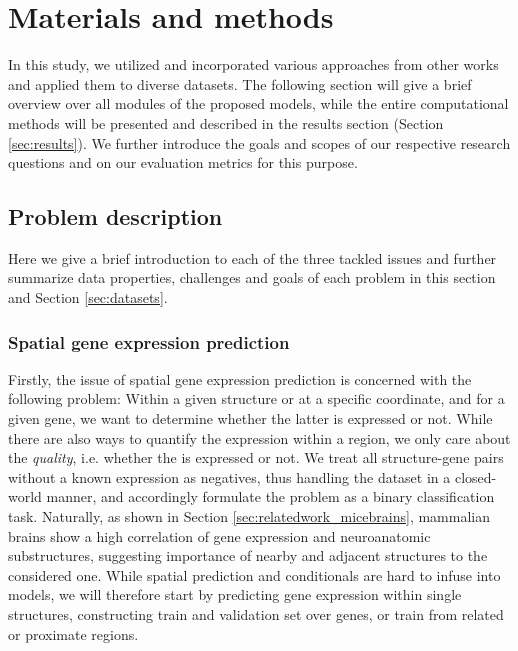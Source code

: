 \documentclass[]{article}
\begin{document}
\newpage
\section{Materials and methods}
\label{sec:methods}
In this study, we utilized and incorporated various approaches from other works and applied them to diverse datasets. The following section will give a brief overview over all modules of the proposed models, while the entire computational methods will be presented and described in the results section (Section \ref{sec:results}). We further introduce the goals and scopes of our respective research questions and on our evaluation metrics for this purpose.  

\subsection{Problem description}
\label{sec:probdesc}
Here we give a brief introduction to each of the three tackled issues and further summarize data properties, challenges and goals of each problem in this section and Section \ref{sec:datasets}. 
\subsubsection{Spatial gene expression prediction}
\label{sec:probdesc_geneexp}
Firstly, the issue of spatial gene expression prediction is concerned with the following problem: Within a given structure or at a specific coordinate, and for a given gene, we want to determine whether the latter is expressed or not. While there are also ways to quantify the expression within a region, we only care about the \textit{quality}, i.e. whether the is expressed or not. We treat all structure-gene pairs without a known expression as negatives, thus handling the dataset in a closed-world manner, and accordingly formulate the problem as a binary classification task. Naturally, as shown in Section \ref{sec:relatedwork_micebrains}, mammalian brains show a high correlation of gene expression and neuroanatomic substructures, suggesting importance of nearby and adjacent structures to the considered one. While spatial prediction and conditionals are hard to infuse into models, we will therefore start by predicting gene expression within single structures, constructing train and validation set over genes, or train from related or proximate regions.
\end{document}
